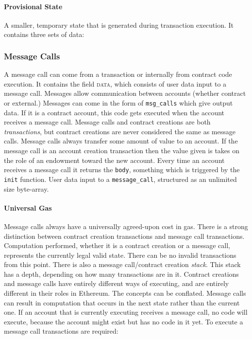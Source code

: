 \documentclass[10pt,a4paper,leqno,bibliography=totoc]{scrartcl}
\newenvironment{alphafootnotes}
{\par\edef\savedfootnotenumber{\number\value{footnote}}
\renewcommand{\thefootnote}{\alph{footnote}}
\setcounter{footnote}{0}}
{\par\setcounter{footnote}{\savedfootnotenumber}}
\begin{document}
\begin{alphafootnotes}
\begin{multicols*}{2}
				\paragraph{Provisional State}
				A smaller, temporary state that is generated during transaction execution. It contains three sets of data:

			\subsubsection{Message Calls}
			A message call can come from a transaction or internally from contract code execution. It contains the field \textsc{data}, which consists of user data input to a message call. Messages allow communication between accounts (whether contract or external.) Messages can come in the form of \texttt{msg\_calls} which give output data. If it is a contract account, this code gets executed when the account receives a message call. Message calls and contract creations are both \textsl{transactions}, but contract creations are never considered the same as message calls. Message calls always transfer some amount of value to an account. If the message call is an account creation transaction then the value given is takes on the role of an endowment toward the new account. Every time an account receives a message call it returns the \texttt{body}, something which is triggered by the \texttt{init} function. User data input to a \texttt{message\_call}, structured as an unlimited size byte-array.

\paragraph{Universal Gas}Message calls always have a universally agreed-upon cost in gas. There is a strong distinction between contract creation transactions and message call transactions. Computation performed, whether it is a contract creation or a message call, represents the currently legal valid state. There can be no invalid transactions from this point. \supercite{Wood2017} There is also a message call/contract creation \textit{stack}. This stack has a depth, depending on how many transactions are in it. Contract creations and message calls have entirely different ways of executing, and are entirely different in their roles in Ethereum. The concepts can be conflated. Message calls can result in computation that occurs in the next state rather than the current one. If an account that is currently executing receives a message call, no code will execute, because the account might exist but has no code in it yet. To execute a message call transactions are required:


\end{multicols*}
\end{alphafootnotes}
\end{document}
